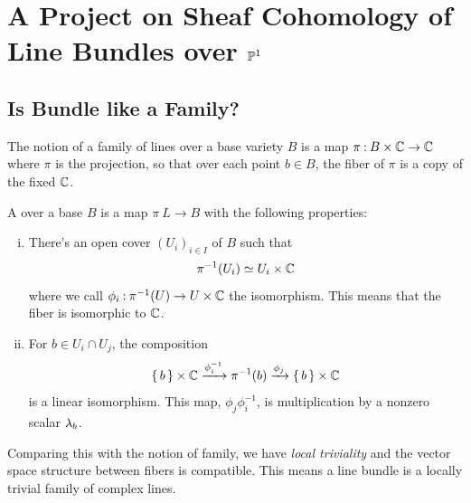 \documentclass[12pt]{memoir}
\begin{document}
\chapter{A Project on Sheaf Cohomology of Line Bundles over $\mathbb{P}^1$}


\section{Is Bundle like a Family?}

The notion of a family of lines over a base variety $B$ is a map $\pi\mathbin{:} B\times\mathbb{C}\to\mathbb{C}$ where $\pi$ is the projection, so that over each point $b\in B$, the fiber of $\pi$ is a copy of the fixed $\mathbb{C}$. 

\begin{Def}
    A  over a base $B$ is a map $\pi\: L\to B$ with the following properties:
    \begin{enumerate}[i)]
        \item There's an open cover $(U_i)_{i\in I}$ of $B$ such that 
        $$\pi^{-1}(U_i)\simeq U_i\times\mathbb{C}$$
        where we call $\phi_i\mathbin{:}\pi^{-1}(U)\to U\times\mathbb{C}$ the isomorphism. This means that the fiber is isomorphic to $\mathbb{C}$.
        \item For $b\in U_i\cap U_j$, the composition
        $$\{\,b\,\}\times\mathbb{C}\xrightarrow[]{\phi_i^{-1}}\pi^{-1}(b)\xrightarrow[]{\phi_j}\{\,b\,\}\times\mathbb{C}$$
        is a linear isomorphism. This map, $\phi_j\phi_i^{-1}$, is multiplication by a nonzero scalar $\lambda_b$.
    \end{enumerate}
\end{Def}

Comparing this with the notion of family, we have \emph{local triviality} and the vector space structure between fibers is compatible. This means a line bundle is a locally trivial family of complex lines. 
\end{document}
